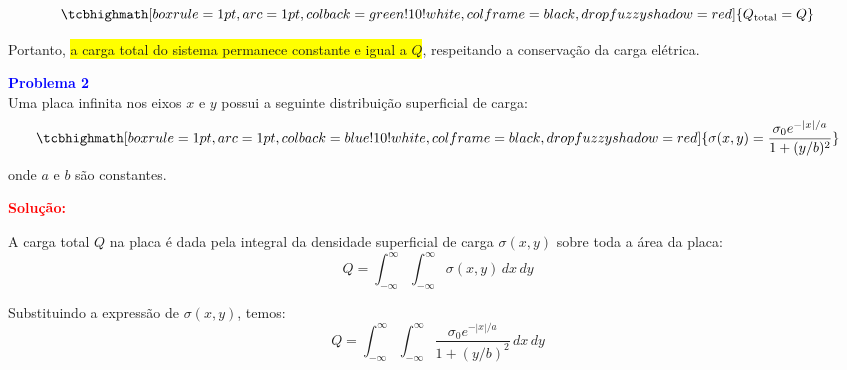 \documentclass[a4paper,12pt]{article}
\begin{document}
\begin{equation}
    \tcbhighmath[boxrule=1pt,arc=1pt,colback=green!10!white,colframe=black,
      drop fuzzy shadow=red]{Q_{\text{total}} = Q}
\end{equation}

Portanto, \colorbox{yellow}{a carga total do sistema permanece constante e igual a \( Q \)}, respeitando a conservação
da carga elétrica.


\newpage 

\begin{flushleft}
\textbf{\textcolor{blue}{\Large Problema 2}}\\
Uma placa infinita nos eixos \(x\) e \(y\) possui a seguinte distribuição superficial de carga:
\begin{equation}
    \tcbhighmath[boxrule=1pt,arc=1pt,colback=blue!10!white,colframe=black,
      drop fuzzy shadow=red]{\sigma(x,y) = \frac{\sigma_0 e^{-|x|/a}}{1 + (y/b)^2}}
\end{equation}
onde \(a\) e \(b\) são constantes. \\

\sloppy
\begin{center}
    \end{center}

\textcolor{red}{\textbf{Solução:}}\\
\end{flushleft}



A carga total \(Q\) na placa é dada pela integral da densidade superficial de carga \(\sigma(x, y)\) sobre toda a área da placa:
\begin{equation}
Q = \int_{-\infty}^{\infty} \int_{-\infty}^{\infty} \sigma(x, y) \, dx \, dy
\end{equation}

Substituindo a expressão de \(\sigma(x, y)\), temos:
\begin{equation}
Q = \int_{-\infty}^{\infty} \int_{-\infty}^{\infty} \frac{\sigma_0 e^{-|x|/a}}{1 + (y/b)^2} \, dx \, dy
\end{equation}
\end{document}
